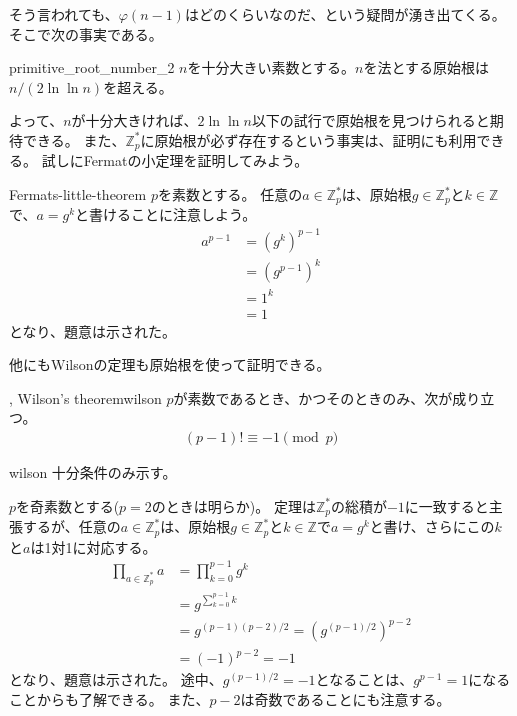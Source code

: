 そう言われても、$\varphi(n-1)$はどのくらいなのだ、という疑問が湧き出てくる。
そこで次の事実である。

\begin{Prop}{}{primitive_root_number_2}
$n$を十分大きい素数とする。$n$を法とする原始根は$n/(2\ln\ln{n})$を超える。
\end{Prop}

よって、$n$が十分大きければ、$2\ln\ln{n}$以下の試行で原始根を見つけられると期待できる。
また、$\mathbb{Z}_p^*$に原始根が必ず存在するという事実は、証明にも利用できる。
試しにFermatの小定理を証明してみよう。

\begin{thProof}{Fermats-little-theorem}
$p$を素数とする。
任意の$a\in\mathbb{Z}_p^*$は、原始根$g\in\mathbb{Z}_p^*$と$k\in\mathbb{Z}$で、$a=g^k$と書けることに注意しよう。
\begin{align*}
a^{p-1} &= (g^k)^{p-1}\\
 &= (g^{p-1})^k\\
 &= 1^k \\
 &= 1
\end{align*}
となり、題意は示された。
\end{thProof}

他にもWilsonの定理も原始根を使って証明できる。

\begin{Theo}{, Wilson's theorem}{wilson}
$p$が素数であるとき、かつそのときのみ、次が成り立つ。
\begin{align*}
(p-1)! \equiv -1 \pmod{p}
\end{align*}
\end{Theo}

\begin{thProof}{wilson}
十分条件のみ示す。

$p$を奇素数とする($p=2$のときは明らか)。
定理は$\mathbb{Z}_p^*$の総積が$-1$に一致すると主張するが、任意の$a\in\mathbb{Z}_p^*$は、原始根$g\in\mathbb{Z}_p^*$と$k\in\mathbb{Z}$で$a=g^k$と書け、さらにこの$k$と$a$は1対1に対応する。
\begin{align*}
\prod_{a \in \mathbb{Z}_p^*} a &= \prod_{k=0}^{p-1} g^k\\
 &= g^{\sum_{k=0}^{p-1}k}\\
 &= g^{(p-1)(p-2)/2} = (g^{(p-1)/2})^{p-2}\\
 &= (-1)^{p-2} = -1
\end{align*}
となり、題意は示された。
途中、$g^{(p-1)/2}=-1$となることは、$g^{p-1}=1$になることからも了解できる。
また、$p-2$は奇数であることにも注意する。
\end{thProof}

